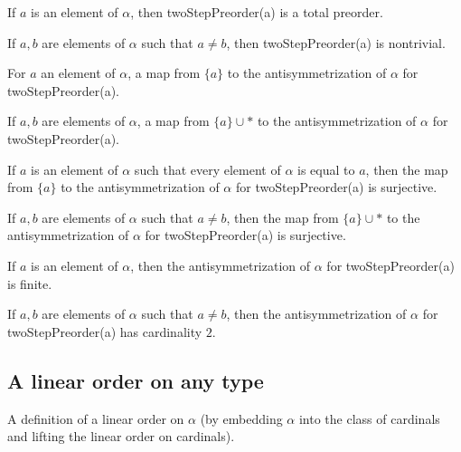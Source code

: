 \begin{sublemma}
If $a$ is an element of $\alpha$, then twoStepPreorder(a) is a total preorder.

\end{sublemma}

\begin{sublemma}
If $a,b$ are elements of $\alpha$ such that $a\ne b$, then twoStepPreorder(a) is nontrivial.

\end{sublemma}

\begin{subdefi}
For $a$ an element of $\alpha$, a map from $\{a\}$ to the antisymmetrization of $\alpha$ for twoStepPreorder(a).

\end{subdefi}

\begin{subdefi}
If $a,b$ are elements of $\alpha$, a map from $\{a\}\cup\ast$ to the antisymmetrization of $\alpha$ for twoStepPreorder(a).

\end{subdefi}

\begin{sublemma}
If $a$ is an element of $\alpha$ such that every element of $\alpha$ is equal to $a$, then the map from
$\{a\}$ to the antisymmetrization of $\alpha$ for twoStepPreorder(a) is surjective.

\end{sublemma}

\begin{sublemma}
If $a,b$ are elements of $\alpha$ such that $a \ne b$, then the 
map from $\{a\}\cup\ast$ to the antisymmetrization of $\alpha$ for twoStepPreorder(a) is surjective.

\end{sublemma}

\begin{sublemma}
If $a$ is an element of $\alpha$, then the antisymmetrization of $\alpha$ for twoStepPreorder(a) is finite.

\end{sublemma}

\begin{sublemma}
If $a,b$ are elements of $\alpha$ such that $a \ne b$, then the 
antisymmetrization of $\alpha$ for twoStepPreorder(a) has cardinality $2$.

\end{sublemma}

\subsection{A linear order on any type}

\begin{subdefi}[ArbitraryLinearOrder]
A definition of a linear order on $\alpha$ (by embedding $\alpha$ into the class of cardinals and lifting the linear order
on cardinals).

\end{subdefi}



